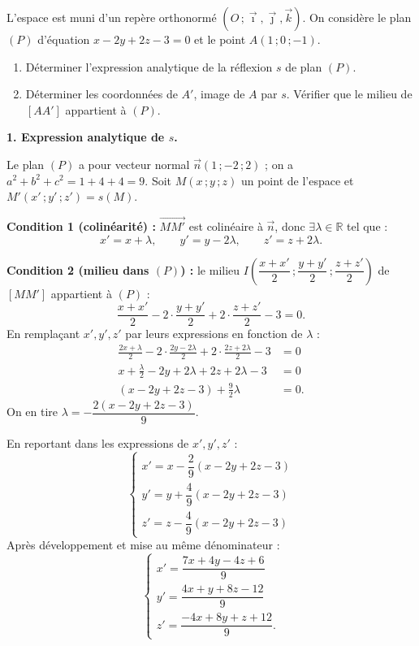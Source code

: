 \documentclass[11pt]{article}
\begin{document}
\begin{exoresolu}
L'espace est muni d'un repère orthonormé $(O\,;\vec{\imath},\vec{\jmath},\vec{k})$. On considère le plan $(P)$ d'équation $x-2y+2z-3=0$ et le point $A(1\,;0\,;-1)$.
\begin{enumerate}
\item Déterminer l'expression analytique de la réflexion $s$ de plan $(P)$.
\item Déterminer les coordonnées de $A'$, image de $A$ par $s$. Vérifier que le milieu de $[AA']$ appartient à $(P)$.
\end{enumerate}
\tcblower
\textbf{1. Expression analytique de $s$.}

Le plan $(P)$ a pour vecteur normal $\vec{n}(1\,;-2\,;2)$ ; on a $a^{2}+b^{2}+c^{2}=1+4+4=9$.
Soit $M(x\,;y\,;z)$ un point de l'espace et $M'(x'\,;y'\,;z')=s(M)$.

\textbf{Condition 1 (colinéarité) :} $\overrightarrow{MM'}$ est colinéaire à $\vec{n}$, donc $\exists\lambda\in\mathbb{R}$ tel que :
\[x'=x+\lambda,\qquad y'=y-2\lambda,\qquad z'=z+2\lambda.\]

\textbf{Condition 2 (milieu dans $(P)$) :} le milieu $I\left(\dfrac{x+x'}{2}\,;\dfrac{y+y'}{2}\,;\dfrac{z+z'}{2}\right)$ de $[MM']$ appartient à $(P)$ :
\[\frac{x+x'}{2}-2\cdot\frac{y+y'}{2}+2\cdot\frac{z+z'}{2}-3=0.\]
En remplaçant $x',y',z'$ par leurs expressions en fonction de $\lambda$ :
\begin{align*}
\frac{2x+\lambda}{2}-2\cdot\frac{2y-2\lambda}{2}+2\cdot\frac{2z+2\lambda}{2}-3&=0\\
x+\tfrac{\lambda}{2}-2y+2\lambda+2z+2\lambda-3&=0\\
(x-2y+2z-3)+\tfrac{9}{2}\lambda&=0.
\end{align*}
On en tire $\lambda=-\dfrac{2(x-2y+2z-3)}{9}$.

En reportant dans les expressions de $x',y',z'$ :
\[\boxed{\begin{cases}
x'=x-\dfrac{2}{9}(x-2y+2z-3)\\[4pt]
y'=y+\dfrac{4}{9}(x-2y+2z-3)\\[4pt]
z'=z-\dfrac{4}{9}(x-2y+2z-3)
\end{cases}}\]
Après développement et mise au même dénominateur :
\[\begin{cases}
x'=\dfrac{7x+4y-4z+6}{9}\\[4pt]
y'=\dfrac{4x+y+8z-12}{9}\\[4pt]
z'=\dfrac{-4x+8y+z+12}{9}.
\end{cases}\]


\end{exoresolu}
\end{document}
